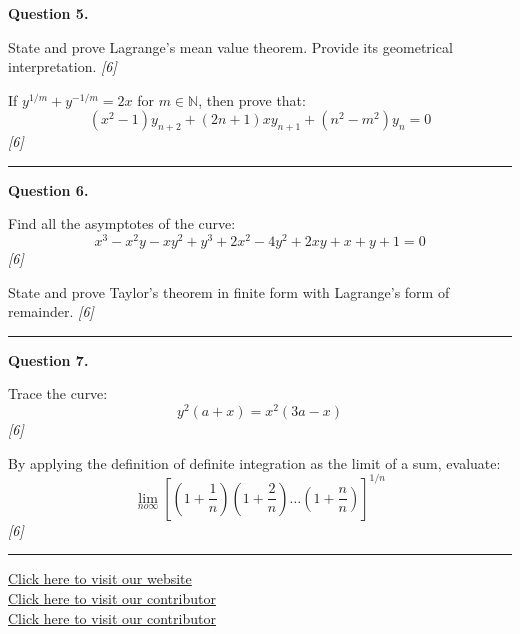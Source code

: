 \documentclass[11pt,a4paper]{article}
\newcommand{\pts}[1]{\hfill   \textit{[#1]}}
\begin{document}
\noindent   \textbf{Question 5.}

\begin{parts}
  \item State and prove Lagrange's mean value theorem. Provide its geometrical interpretation. \pts{6}
  \item If $y^{1/m} + y^{-1/m} = 2x$ for $m \in \mathbb{N}$, then prove that:
  \[
  (x^2-1) y_{n+2} + (2n+1) x y_{n+1} + (n^2-m^2) y_n = 0
  \] \pts{6}
\end{parts}

\medskip\rule{\linewidth}{0.2pt}

\medskip


\noindent   \textbf{Question 6.}

\begin{parts}
  \item Find all the asymptotes of the curve:
  \[
  x^3 - x^2y - xy^2 + y^3 + 2x^2 - 4y^2 + 2xy + x + y + 1 = 0
  \] \pts{6}
  \item State and prove Taylor's theorem in finite form with Lagrange's form of remainder. \pts{6}
\end{parts}

\medskip\rule{\linewidth}{0.2pt}

\medskip


\noindent   \textbf{Question 7.}

\begin{parts}
  \item Trace the curve:
  \[
  y^2(a+x) = x^2(3a-x)
  \] \pts{6}
  \item By applying the definition of definite integration as the limit of a sum, evaluate:
  \[
  \lim_{n o\infty} \left[ \left(1 + \frac{1}{n}\right)\left(1 + \frac{2}{n}\right)\dots\left(1 + \frac{n}{n}\right) \right]^{1/n}
  \] \pts{6}
\end{parts}

\vfill
\rule{\linewidth}{0.4pt}

\begin{center}\small
  \href{https://bhu-exam.vercel.app/}{Click here to visit our website}\\[4pt]
  \href{https://me-aryan.vercel.app/}{Click here to visit our contributor}\\[4pt]
  \href{https://quashan-me.vercel.app/}{Click here to visit our contributor}
\end{center}
\end{document}
